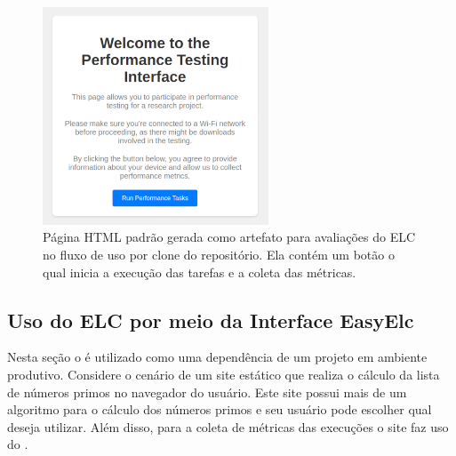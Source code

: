 \documentclass[12pt]{tcc}
\begin{document}
	\begin{figure}[!ht]
		\centering
		\includegraphics[width=0.6\textwidth]{figures/elc-clone-artifact.png}
		\caption[Página padrão do ELC quando clonado do repositório]{Página HTML padrão gerada como artefato para avaliações do ELC no fluxo de uso por clone do repositório. Ela contém um botão o qual inicia a execução das tarefas e a coleta das métricas.}
		\label{fig:elc_clone_artifact}
	\end{figure}

	\subsection{Uso do ELC por meio da Interface EasyElc}
	\label{subsection:study-case-easyelc}

	Nesta seção o  é utilizado como uma dependência de um projeto em ambiente produtivo.
	Considere o cenário de um site estático que realiza o cálculo da lista de números primos no navegador do usuário.
	Este site possui mais de um algoritmo para o cálculo dos números primos e seu usuário pode escolher qual deseja utilizar.
	Além disso, para a coleta de métricas das execuções o site faz uso do .

\end{document}
